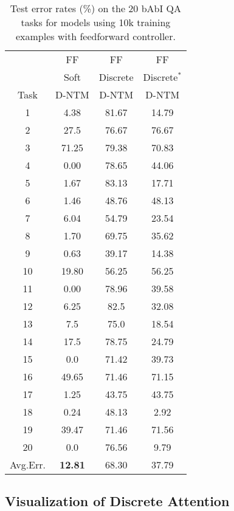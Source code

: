 \documentclass[12pt]{article}
\begin{document}
\begin{table*}[htbp]
\vspace{-2mm}
  \centering
  \tiny 
\begin{tabular}{ |c|c|c|c| }
\hline
& FF & FF & FF\\ 
& Soft & Discrete & Discrete$^*$\\
Task &  D-NTM & D-NTM & D-NTM\\ \hline
1   &   4.38    &   81.67   &   14.79\\
2   &   27.5    &   76.67   &   76.67\\
3   &   71.25   &   79.38   &   70.83\\
4   &   0.00    &   78.65   &   44.06\\
5   &   1.67    &   83.13   &   17.71\\
6   &   1.46    &   48.76   &   48.13\\
7   &   6.04    &   54.79   &   23.54\\
8   &   1.70    &   69.75   &   35.62\\
9   &   0.63    &   39.17   &   14.38\\
10  &   19.80   &   56.25   &   56.25\\
11  &   0.00    &   78.96   &   39.58\\
12  &   6.25    &   82.5    &   32.08\\
13  &   7.5     &   75.0    &   18.54\\
14  &   17.5    &   78.75   &   24.79\\
15  &   0.0     &   71.42   &   39.73\\
16  &   49.65   &   71.46   &   71.15\\
17  &   1.25    &   43.75   &   43.75\\
18  &   0.24    &   48.13   &   2.92\\
19  &   39.47   &   71.46   &   71.56\\
20  &   0.0     &   76.56   &   9.79\\\hline
Avg.Err. & \textbf{12.81} & 68.30 & 37.79\\\hline
\end{tabular}
\caption{Test error rates (\%) on the 20 bAbI QA tasks for models using 10k training examples with feedforward controller.}
\label{app:babi_10k_soft2}
\end{table*}


\subsection{Visualization of Discrete Attention}
\end{document}
